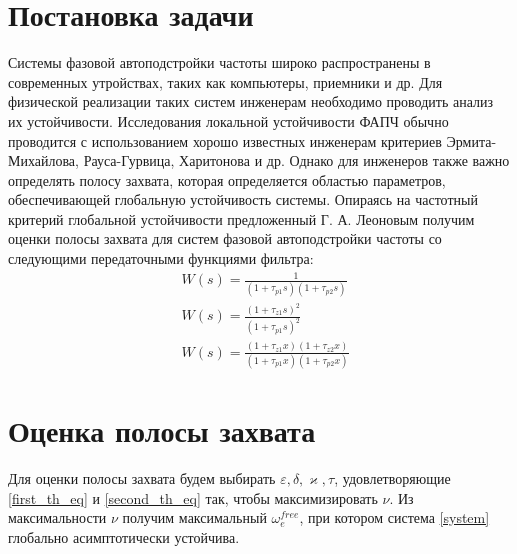 \documentclass[a4paper,14pt]{article} %
\theoremstyle{cited}
\begin{document}
\newpage
\section{Постановка задачи}
Системы фазовой автоподстройки частоты широко распространены в современных утройствах, таких как компьютеры, приемники и др. Для физической реализации таких систем инженерам необходимо проводить анализ их устойчивости. Исследования локальной устойчивости ФАПЧ обычно проводится с использованием хорошо известных инженерам критериев Эрмита-Михайлова, Рауса-Гурвица, Харитонова и др. Однако для инженеров также важно определять полосу захвата, которая определяется областью параметров, обеспечивающей глобальную устойчивость системы. Опираясь на частотный критерий глобальной устойчивости предложенный Г. А. Леоновым получим оценки полосы захвата для систем фазовой автоподстройки частоты со следующими передаточными функциями фильтра: 
 \begin{align}
&W(s) = \frac{1}{(1+\tau_{p1}s)(1+\tau_{p2}s)}\\[5pt]
&W(s) = \frac{(1+\tau_{z1}s)^2}{(1+\tau_{p1}s)^2}\\[5pt]
&W(s) = \frac{(1+\tau_{z1}x)(1+\tau_{z2}x)}{(1+\tau_{p1}x)(1+\tau_{p2}x)}
 \end{align}

\pagebreak
\section{Оценка полосы захвата}
Для оценки полосы захвата будем выбирать $\varepsilon, \delta, \varkappa, \tau$, удовлетворяющие \eqref{first_th_eq} и \eqref{second_th_eq} так, чтобы максимизировать $\nu$. Из максимальности $\nu$ получим максимальный $\omega_e^{free}$, при котором система \eqref{system} глобально асимптотически устойчива.
\end{document}
